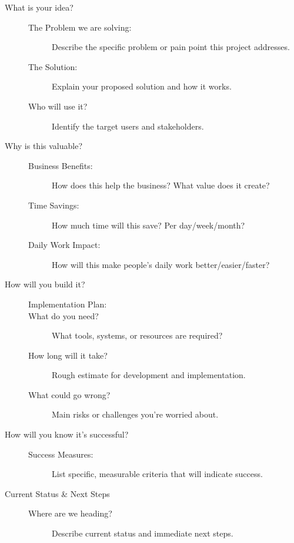 \documentclass[]{imc-inf}
\begin{document}
\begin{description}
	\item[What is your idea?] 
	\begin{description}
		\item[The Problem we are solving:] Describe the specific problem or pain point this project addresses.
		\item[The Solution:] Explain your proposed solution and how it works.
		\item[Who will use it?] Identify the target users and stakeholders.
	\end{description}
	
	\vspace{1ex}
	\item[Why is this valuable?] 
	\begin{description}
		\item[Business Benefits:] How does this help the business? What value does it create?
		\item[Time Savings:] How much time will this save? Per day/week/month?
		\item[Daily Work Impact:] How will this make people's daily work better/easier/faster?
	\end{description}
	
	\vspace{1ex}
	\item[How will you build it?] 
	\begin{description}
		\item[Implementation Plan:] 
		\item[What do you need?] What tools, systems, or resources are required?
		\item[How long will it take?] Rough estimate for development and implementation.
		\item[What could go wrong?] Main risks or challenges you're worried about.
	\end{description}
	
	\vspace{1ex}
	\item[How will you know it's successful?] 
	\begin{description}
		\item[Success Measures:] List specific, measurable criteria that will indicate success.
	\end{description}
	
	\vspace{1ex}
	\item[Current Status \& Next Steps]
	\begin{description}
		\item[Where are we heading?] Describe current status and immediate next steps.
	\end{description}
\end{description}
\end{document}
